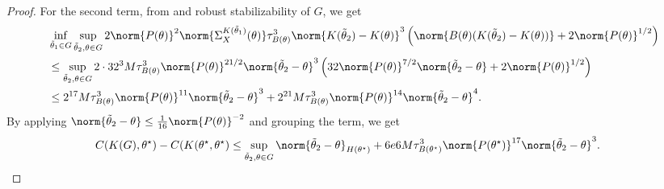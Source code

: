 \begin{proof}
    For the second term, from  and robust stabilizability of $G$, we get
    \begin{align*}
        &\inf_{\tilde\theta_1\in G}\sup_{\tilde\theta_2, \theta\in G}2 \norm{P(\theta)}^2 \norm{\Sigma_X^{K(\tilde\theta_1)}(\theta)}\tau_{B(\theta)}^3\norm{K(\tilde\theta_2)-K(\theta)}^3\left(\norm{B(\theta)(K(\tilde\theta_2)-K(\theta))} + 2 \norm{P(\theta)}^{1/2}\right) \\
        &\leq \sup_{\tilde\theta_2, \theta\in G}2\cdot32^3M\tau^3_{B(\theta)}\norm{P(\theta)}^{21/2}\norm{\tilde\theta_2-\theta}^3\left(32\norm{P(\theta)}^{7/2}\norm{\tilde\theta_2-\theta} + 2\norm{P(\theta)}^{1/2}\right) \\
        &\leq 2^{17}M\tau^3_{B(\theta)}\norm{P(\theta)}^{11}\norm{\tilde\theta_2-\theta}^3 + 2^{21}M\tau^3_{B(\theta)}\norm{P(\theta)}^{14}\norm{\tilde\theta_2-\theta}^4.
    \end{align*}
    By applying $\norm{\tilde\theta_2-\theta}\leq\frac{1}{16}\norm{P(\theta)}^{-2}$ and grouping the term, we get
    \begin{align*}
        &C(K(G), \theta^\star) - C(K(\theta^\star, \theta^\star) \leq \sup_{\tilde\theta_2, \theta\in G}\norm{\tilde\theta_2-\theta}_{H(\theta^\star)} + 6e6M\tau^3_{B(\theta^\star)}\norm{P(\theta^\star)}^{17}\norm{\tilde\theta_2-\theta}^3.
    \end{align*}
\end{proof}
    


